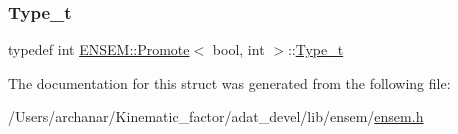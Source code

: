 \subsubsection{\texorpdfstring{Type\_t}{Type\_t}\hspace{0.1cm}{\footnotesize\ttfamily [2/2]}}
{\footnotesize\ttfamily typedef int \mbox{\hyperlink{structENSEM_1_1Promote}{E\+N\+S\+E\+M\+::\+Promote}}$<$ bool, int $>$\+::\mbox{\hyperlink{structENSEM_1_1Promote_3_01bool_00_01int_01_4_a99e4da6ec7e0f07a99dc32a1da962371}{Type\+\_\+t}}}



The documentation for this struct was generated from the following file\+:\begin{DoxyCompactItemize}
\item 
/\+Users/archanar/\+Kinematic\+\_\+factor/adat\+\_\+devel/lib/ensem/\mbox{\hyperlink{lib_2ensem_2ensem_8h}{ensem.\+h}}\end{DoxyCompactItemize}
